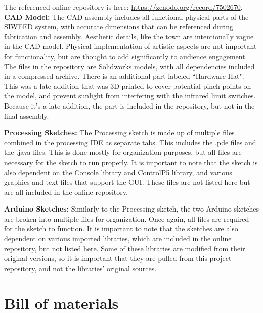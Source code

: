 \documentclass[11pt, letterpaper]{article}
\begin{document}
\newline
The referenced online repository is here: \href{https://zenodo.org/record/7502670}{https://zenodo.org/record/7502670}.
\newline
\textbf{CAD Model:}
The CAD assembly includes all functional physical parts of the SIWEED system, with accurate dimensions that can be referenced during fabrication and assembly.
Aesthetic details, like the town are intentionally vague in the CAD model.
Physical implementation of artistic aspects are not important for functionality, but are thought to add significantly to audience engagement.
The files in the repository are Solidworks models, with all dependencies included in a compressed archive.
There is an additional part labeled ``Hardware Hat". 
This was a late addition that was 3D printed to cover potential pinch points on the model, and prevent sunlight from interfering with the infrared limit switches. 
Because it's a late addition, the part is included in the repository, but not in the final assembly. 
\par


\textbf{Processing Sketches:}
The Processing sketch is made up of multiple files combined in the processing IDE as separate tabs. 
This includes the .pde files and the .java files.
This is done mostly for organization purposes, but all files are necessary for the sketch to run properly. 
It is important to note that the sketch is also dependent on the Console library and ControlP5 library, and various graphics and text files that support the GUI. 
These files are not listed here but are all included in the online repository.
\par


\textbf{Arduino Sketches:}
Similarly to the Processing sketch, the two Arduino sketches are broken into multiple files for organization.
Once again, all files are required for the sketch to function.
It is important to note that the sketches are also dependent on various imported libraries, which are included in the online repository, but not listed here.
Some of these libraries are modified from their original versions, so it is important that they are pulled from this project repository, and not the libraries' original sources.

\section{Bill of materials}
\end{document}
